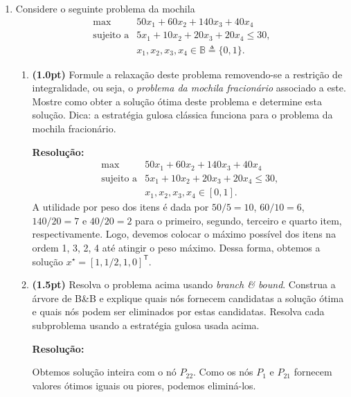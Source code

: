 \documentclass{article}
\newcommand{\T}{\mathsf{T}}
\begin{document}
\begin{enumerate}[label=$\blacktriangleright$ {\bf Questão \arabic*:},series=exerc,align=left]
\pagebreak

\item Considere o seguinte problema da mochila
\[
\begin{array}{rl}
  \max & 50x_1 + 60x_2 + 140 x_3 + 40x_4 \\
  \text{sujeito a} & 5x_1 + 10 x_2 + 20 x_3 + 20 x_4 \leq 30,\\
  & x_1,x_2,x_3,x_4 \in \mathbb{B} \triangleq \{0,1\}.
\end{array}
\]
\begin{enumerate}[label=(\alph*),series=q2]
\item {\bf (1.0pt)} Formule a relaxação deste problema removendo-se a restrição de integralidade, ou seja, o {\em problema da mochila fracionário} associado a este. Mostre como obter a solução ótima deste problema e determine esta solução. Dica: a estratégia gulosa clássica funciona para o problema da mochila fracionário.
\begin{framed}
{\bf Resolução:}
\[
\begin{array}{rl}
  \max & 50x_1 + 60x_2 + 140 x_3 + 40x_4 \\
  \text{sujeito a} & 5x_1 + 10 x_2 + 20 x_3 + 20 x_4 \leq 30,\\
  & x_1,x_2,x_3,x_4 \in [0,1].
\end{array}
\]
A utilidade por peso dos itens é dada por $50/5 = 10$, $60/10 = 6$, $140/20 = 7$ e $40/20 = 2$ para o primeiro, segundo, terceiro e quarto item, respectivamente. Logo, devemos colocar o máximo possível dos itens na ordem 1, 3, 2, 4 até atingir o peso máximo. Dessa forma, obtemos a solução $x^\star = [1, 1/2, 1, 0]^\T$.
\end{framed}

\item {\bf (1.5pt)} Resolva o problema acima usando {\em branch \& bound}. Construa a árvore de B\&B e explique quais nós fornecem candidatas a solução ótima e quais nós podem ser eliminados por estas candidatas. Resolva cada subproblema usando a estratégia gulosa usada acima.
\begin{framed}
{\bf Resolução:}
\begin{center}
    
\end{center}
Obtemos solução inteira com o nó $P_{22}$. Como os nós $P_1$ e $P_{21}$ fornecem valores ótimos iguais ou piores, podemos eliminá-los. 
\end{framed}

\end{enumerate}
\end{enumerate}
\end{document}
